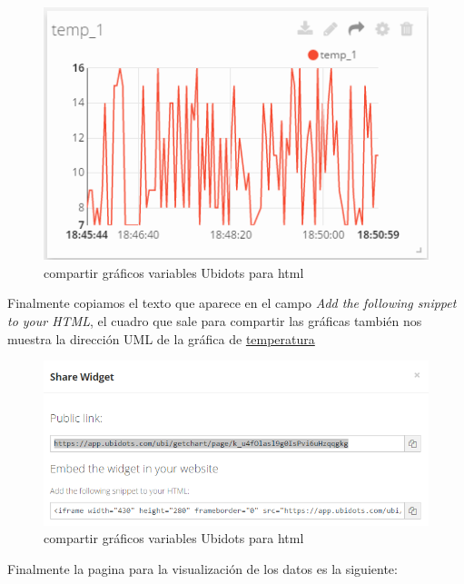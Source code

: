 \documentclass[10pt]{article}\usepackage[]{graphicx}\usepackage[]{color}
\begin{document}
		\begin{figure}[H] 
			\centering
			\includegraphics[scale=0.8]{html1}  
			\caption{compartir gráficos variables Ubidots para html}	
		\end{figure}

Finalmente copiamos el texto que aparece en el campo \textit{Add the following snippet to your HTML}, el cuadro que sale para compartir las gráficas también nos muestra la dirección UML de la gráfica de  \href{https://app.ubidots.com/ubi/getchart/page/k_u4fOlasl9g0IsPvi6uHzqqgkg}{temperatura}	
	
		\begin{figure}[H] 
			\centering
			\includegraphics[scale=0.8]{html2}  
			\caption{compartir gráficos variables Ubidots para html}	
		\end{figure}

Finalmente la pagina para la visualización de los datos es la siguiente:
\end{document}
